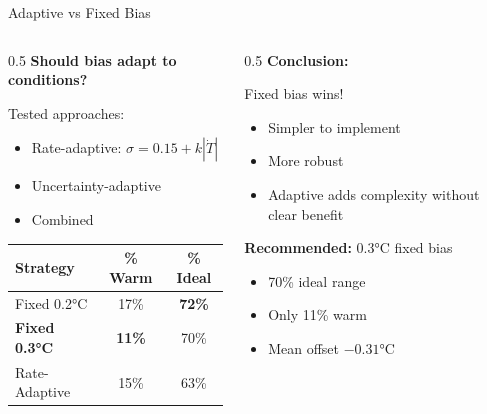 \documentclass[aspectratio=169,11pt]{beamer}
\begin{document}
\begin{frame}{Adaptive vs Fixed Bias}

\begin{columns}
\begin{column}{0.5\textwidth}
\textbf{Should bias adapt to conditions?}

\vspace{0.5em}

Tested approaches:
\begin{itemize}
    \item Rate-adaptive: $\sigma = 0.15 + k|\dot{T}|$
    \item Uncertainty-adaptive
    \item Combined
\end{itemize}

\vspace{0.5em}

\begin{tabular}{l|cc}
\toprule
\textbf{Strategy} & \textbf{\% Warm} & \textbf{\% Ideal} \\
\midrule
Fixed 0.2°C & 17\% & \textbf{72\%} \\
\textbf{Fixed 0.3°C} & \textbf{11\%} & 70\% \\
Rate-Adaptive & 15\% & 63\% \\
\bottomrule
\end{tabular}
\end{column}

\begin{column}{0.5\textwidth}
\textbf{Conclusion:}

\vspace{0.5em}

Fixed bias wins!
\begin{itemize}
    \item Simpler to implement
    \item More robust
    \item Adaptive adds complexity without clear benefit
\end{itemize}

\vspace{0.5em}

\textbf{Recommended:} 0.3°C fixed bias
\begin{itemize}
    \item 70\% ideal range
    \item Only 11\% warm
    \item Mean offset $-0.31$°C
\end{itemize}
\end{column}
\end{columns}

\end{frame}
\end{document}
